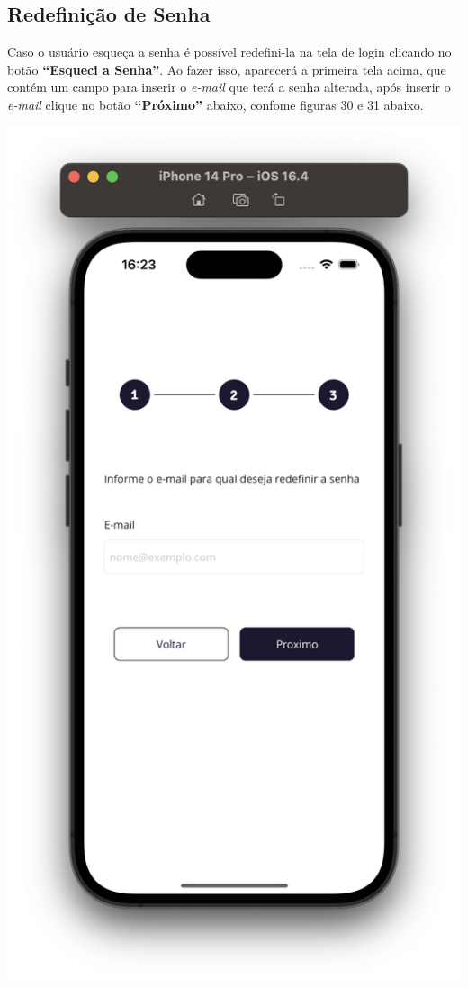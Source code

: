 \subsection{Redefinição de Senha}

Caso o usuário esqueça a senha é possível redefini-la na tela de login clicando no botão \textbf{“Esqueci a Senha”}. Ao fazer isso, aparecerá a primeira tela acima, que contém um campo para inserir o \textit{e-mail} que terá a senha alterada, após inserir o \textit{e-mail} clique no botão \textbf{“Próximo”} abaixo, confome figuras 30 e 31 abaixo. 

    \vspace{\baselineskip}
    \begin{center}
        \begin{minipage}{0.4\textwidth}
            \centering
            \includegraphics[scale=0.2]{figs/figura30.png}

\end{minipage}
\end{center}
